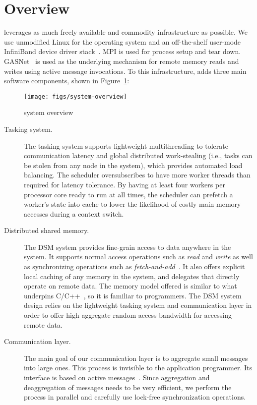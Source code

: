 \section{\Grappa Overview}

\Grappa leverages as much freely available and commodity infrastructure as
possible. We use unmodified Linux for the operating system and an
off-the-shelf user-mode InfiniBand device driver stack~\cite{OFED}. MPI is
used for process setup and tear down. GASNet~\cite{gasnet} is used as the
underlying mechanism for remote memory reads and writes using active message
invocations. To this infrastructure, \Grappa adds  three main software components, shown in Figure~\ref{fig:grappa}:

\begin{figure}[t]
\begin{center}
  \texttt{[image: figs/system-overview]}
\begin{minipage}{0.95\columnwidth}
  \caption{\label{fig:grappa} \Grappa system overview}
\end{minipage}
\vspace{-3ex}
\end{center}
\end{figure}

\begin{description}

\item [Tasking system.] The tasking system supports lightweight multithreading
to tolerate communication latency and global distributed work-stealing (i.e.,
tasks can be stolen from any node in the system), which provides automated
load balancing. The scheduler oversubscribes to have more worker threads than
required for latency tolerance. By having at least four workers per processor
core ready to run at all times, the scheduler can prefetch a worker's state
into cache to lower the likelihood of costly main memory accesses during a
context switch.

\item[Distributed shared memory.] The DSM system provides fine-grain access to
data anywhere in the system. It supports normal access operations such as
\emph{read\/} and \emph{write\/} as well as synchronizing operations such as
\emph{fetch-and-add\/}~\cite{fetchandadd}. It also offers explicit local
caching of any memory in the system, and delegates that directly operate on
remote data. The memory model offered is similar to what underpins
C/C++~\cite{N2480,N2800}, so it is familiar to programmers. The DSM system
design relies on the lightweight tasking system and communication layer in
order to offer high aggregate random access bandwidth for accessing remote
data.

\item[Communication layer.] The main goal of our communication layer is to
aggregate small messages into large ones.  This process is invisible to the application
programmer. Its interface is based on active messages~\cite{vonEicken92}.
Since aggregation and deaggregation of messages needs to be very efficient, we perform the process in parallel and carefully use lock-free synchronization
operations.

\end{description}
